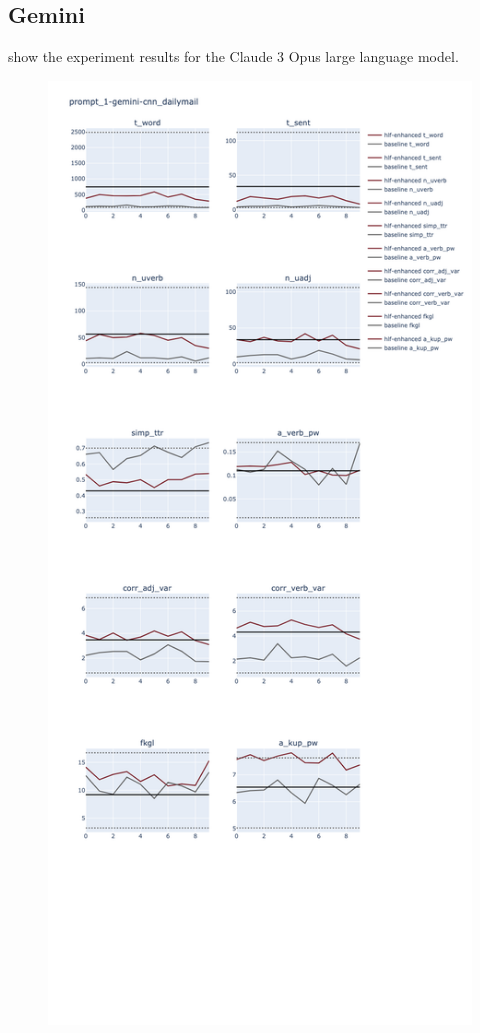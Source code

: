\documentclass[11pt]{article}
\begin{document}
\subsection{Gemini}

show the experiment results for the Claude 3 Opus large language model.

\begin{figure}[ht]
    \includegraphics[width=\textwidth,height=0.9\textheight,scale=1]{plots/prompt_1/prompt_1-gemini-cnn_dailymail/prompt_1-gemini-cnn_dailymail.png}

\end{figure}
\end{document}
